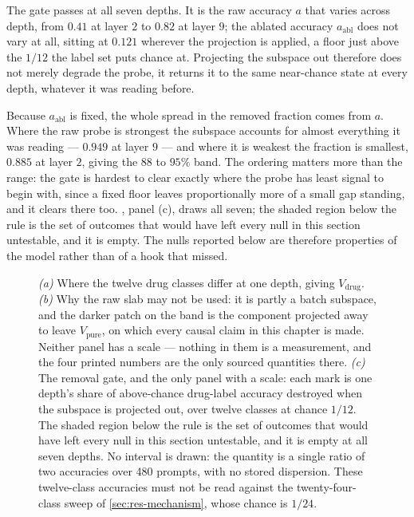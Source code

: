 The gate passes at all seven depths. It is the raw accuracy $a$ that varies
across depth, from $0.41$ at layer $2$ to $0.82$ at layer $9$; the ablated
accuracy $a_{\textrm{abl}}$ does not vary at all, sitting at $0.121$ wherever
the projection is applied, a floor just above the $1/12$ the label set puts
chance at. Projecting the subspace out therefore does not merely degrade the
probe, it returns it to the same near-chance state at every depth, whatever it
was reading before.

Because $a_{\textrm{abl}}$ is fixed, the whole spread in the removed fraction
comes from $a$. Where the raw probe is strongest the subspace accounts for
almost everything it was reading --- $0.949$ at layer $9$ --- and where it is
weakest the fraction is smallest, $0.885$ at layer $2$, giving the $88$ to
$95\%$ band. The ordering matters more than the range: the gate is hardest to
clear exactly where the probe has least signal to begin with, since a fixed
floor leaves proportionally more of a small gap standing, and it clears there
too. , panel (c), draws all seven; the shaded region below the
rule is the set of outcomes that would have left every null in this section
untestable, and it is empty. The nulls reported below are therefore properties
of the model rather than of a hook that missed.

\begin{figure}[htbp]
\begin{fullwidth}
\centering

\caption[The drug slab and its removal gate]{ \emph{(a)} Where the
twelve drug classes differ at one depth, giving $V_{\textrm{drug}}$.
\emph{(b)} Why the raw slab may not be used: it is partly a batch subspace, and
the darker patch on the band is the component projected away to leave
$V_{\textrm{pure}}$, on which every causal claim in this chapter is made.
Neither panel has a scale --- nothing in them is a measurement, and the four
printed numbers are the only sourced quantities there. \emph{(c)} The removal
gate, and the only panel with a scale: each mark is one depth's share of
above-chance drug-label accuracy destroyed when the subspace is projected out,
over twelve classes at chance $1/12$. The shaded region below the rule is the
set of outcomes that would have left every null in this section untestable, and
it is empty at all seven depths. No interval is drawn: the quantity is a single
ratio of two accuracies over \num{480} prompts, with no stored dispersion. These
twelve-class accuracies must not be read against the twenty-four-class sweep of
\cref{sec:res-mechanism}, whose chance is $1/24$.}
\label{fig:purify}
\end{fullwidth}
\end{figure}

